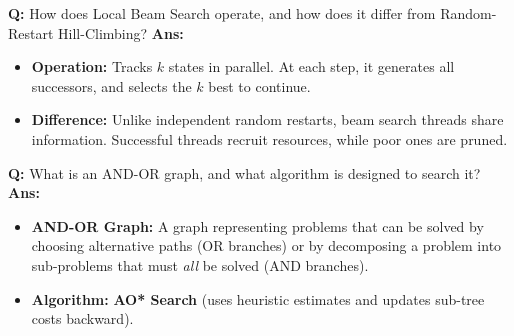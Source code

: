 \documentclass[10pt,a4paper,twocolumn]{article}
\begin{document}
\begin{tcolorbox}[
  colback=white,
  colframe=UnitColorFour,
  colbacktitle=gray!10!white,
  coltitle=black,
  fonttitle=\bfseries\sffamily\small,
  title={Unit IV $\bullet$ Card 7: Local Beam Search k-value},
  boxrule=1.2pt,
  arc=2mm,
  outer arc=2mm,
  boxsep=1.5mm,
  top=1mm,
  bottom=1mm,
  left=1.5mm,
  right=1.5mm,
  before skip=2.5mm,
  after skip=2.5mm
]
\textbf{Q:} How does Local Beam Search operate, and how does it differ from Random-Restart Hill-Climbing?
\tcbline
\textbf{Ans:} \begin{itemize}
  \item   \textbf{Operation:} Tracks $k$ states in parallel. At each step, it generates all successors, and selects the $k$ best to continue.
  \item   \textbf{Difference:} Unlike independent random restarts, beam search threads share information. Successful threads recruit resources, while poor ones are pruned.
\end{itemize}
\end{tcolorbox}


\begin{tcolorbox}[
  colback=white,
  colframe=UnitColorFour,
  colbacktitle=gray!10!white,
  coltitle=black,
  fonttitle=\bfseries\sffamily\small,
  title={Unit IV $\bullet$ Card 8: AND-OR Graph Search},
  boxrule=1.2pt,
  arc=2mm,
  outer arc=2mm,
  boxsep=1.5mm,
  top=1mm,
  bottom=1mm,
  left=1.5mm,
  right=1.5mm,
  before skip=2.5mm,
  after skip=2.5mm
]
\textbf{Q:} What is an AND-OR graph, and what algorithm is designed to search it?
\tcbline
\textbf{Ans:} \begin{itemize}
  \item   \textbf{AND-OR Graph:} A graph representing problems that can be solved by choosing alternative paths (OR branches) or by decomposing a problem into sub-problems that must \textit{all} be solved (AND branches).
  \item   \textbf{Algorithm:} \textbf{AO* Search} (uses heuristic estimates and updates sub-tree costs backward).
\end{itemize}
\end{tcolorbox}
\end{document}
